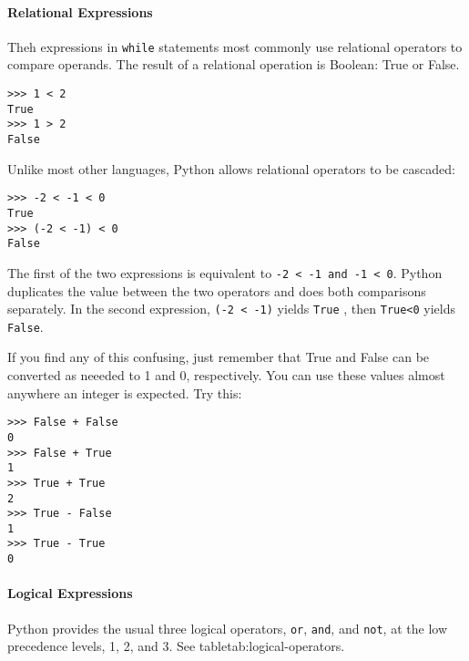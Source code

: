 \paragraph{Relational Expressions}\label{relational-expressions}

Theh expressions in \texttt{while} statements most commonly use relational operators to compare operands.
The result of a relational operation is Boolean: True or False.

\begin{verbatim}
>>> 1 < 2
True
>>> 1 > 2
False
\end{verbatim}

Unlike most other languages, Python
allows relational operators to be cascaded:

\begin{verbatim}
>>> -2 < -1 < 0
True
>>> (-2 < -1) < 0
False
\end{verbatim}

The first of the two expressions is
equivalent to \texttt{-2 \textless{} -1 and -1 \textless{} 0}. Python
duplicates the value between the two operators and does both comparisons
separately. In the second expression, \texttt{(-2 \textless{} -1)} yields
\texttt{True} , then \texttt{True\textless{}0} yields \texttt{False}.

If you find any of this confusing, just remember that True and False can
be converted as neeeded to 1 and 0, respectively. You can use these values
almost anywhere an integer is expected. Try this:

\begin{verbatim}
>>> False + False
0
>>> False + True
1
>>> True + True
2
>>> True - False
1
>>> True - True
0

\end{verbatim}

\paragraph{Logical Expressions}
\label{logical-expressions}

Python provides the usual three logical operators, \texttt{or}, \texttt{and}, and \texttt{not}, at the low 
precedence levels, 1, 2, and 3. See table{tab:logical-operators}.

